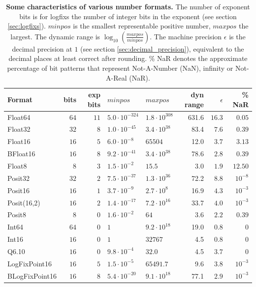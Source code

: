\begin{table}[htbp]
	\renewcommand{\arraystretch}{1.1}
	\center
	\begin{tabular}{l | r | r | l | l | r | r | r}
	\textbf{Format} & bits & exp bits & $minpos$ & $maxpos$ & dyn range & $\epsilon$ &  \% NaR \\
	\hline
	Float64    & $64$ & $11$ & $5.0 \cdot 10^{-324}$ & $1.8 \cdot 10^{308}$ & 631.6 & $16.3$ & $0.05$ \\
	Float32    & $32$ & $8$ & $1.0 \cdot 10^{-45}$ & $3.4 \cdot 10^{38}$ & 83.4 & $7.6$ & $0.39$ \\
	Float16    & $16$ & $5$ & $6.0 \cdot 10^{-8}$ & $65504$ & 12.0 & $3.7$ & $3.13$ \\
	BFloat16    & $16$ & $8$ & $ 9.2 \cdot 10^{-41}$ & $3.4 \cdot 10^{38}$ & 78.6 & $2.8$ & $0.39$  \\
        Float8 & $8$ & $3$ & $1.5 \cdot 10^{-2}$ & $15.5$ & 3.0 & $1.9$ & $12.50$\\
        \hline
        Posit32 & $32$ & $2$ &  $7.5 \cdot 10^{-37}$ & $1.3 \cdot 10^{36}$ & 72.2 & $8.8$ & $10^{-8}$ \\
        Posit16 & $16$ & $1$ & $3.7 \cdot 10^{-9}$ & $2.7 \cdot 10^{8}$ & 16.9 & $4.3$ & $10^{-3}$\\
        Posit(16,2) & $16$ & $2$ & $1.4 \cdot 10^{-17}$ & $7.2 \cdot 10^{16}$ & 33.7 & $4.0$ & $10^{-3}$\\
        Posit8 & $8$ & $0$ & $1.6 \cdot 10^{-2}$ & $64$ & 3.6 & $2.2$ & $0.39$  \\
        \hline
        Int64 & $64$ & $0$ & $1$ & $9.2 \cdot 10^{18}$ & 19.0 & $0.8$ & $0$\\
        Int16 & $16$ & $0$ & $1$ & $32767$ & 4.5 & $0.8$ & $0$\\
        Q6.10 & $16$ & $0$ & $9.8 \cdot 10^{-4}$ & $32.0$ & 4.5 & $3.7$ & $0$\\
        \hline
        LogFixPoint16 & $16$ & $5$ & $1.5 \cdot 10^{-5}$ & $65491.7$ & 9.6 & $3.8$ & $10^{-3}$\\
        BLogFixPoint16 & $16$ & $8$ & $5.4 \cdot 10^{-20}$ & $9.1 \cdot 10^{18}$ & 77.1 & $2.9$ & $10^{-3}$
        \end{tabular}
        \vspace{10pt}
	\caption{\textbf{Some characteristics of various number formats.} The number of exponent bits is for logfixs the number of
	integer bits in the exponent (see section \ref{sec:logfixs}). $minpos$ is the smallest representable positive number,
	$maxpos$ the largest. The dynamic range is $\log_{10}(\tfrac{maxpos}{minpos})$. The machine precision $\epsilon$ is the decimal
	precision at $1$ (see section \ref{sec:decimal_precision}), equivalent to the decimal places at least correct after rounding.
	\% NaR denotes the approximate percentage of bit patterns that represent Not-A-Number (NaN), infinity or Not-A-Real (NaR).}
	\label{tab:formats}
\end{table}

